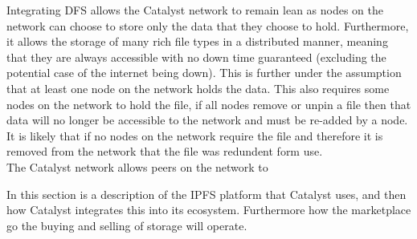 Integrating DFS allows the Catalyst network to remain lean as nodes on the network can choose to store only the data that they choose to hold. Furthermore, it allows the storage of many rich file types in a distributed manner, meaning that they are always accessible with no down time guaranteed (excluding the potential case of the internet being down). This is further under the assumption that at least one node on the network holds the data. This also requires some nodes on the network to hold the file, if all nodes remove or unpin a file then that data will no longer be accessible to the network and must be re-added by a node. It is likely that if no nodes on the network require the file and therefore it is removed from the network that the file was redundent form use.\\ %

The Catalyst network allows peers on the network to 

In this section is a description of the IPFS platform that Catalyst uses, and then how Catalyst integrates this into its ecosystem. Furthermore how the marketplace go the buying and selling of storage will operate. 